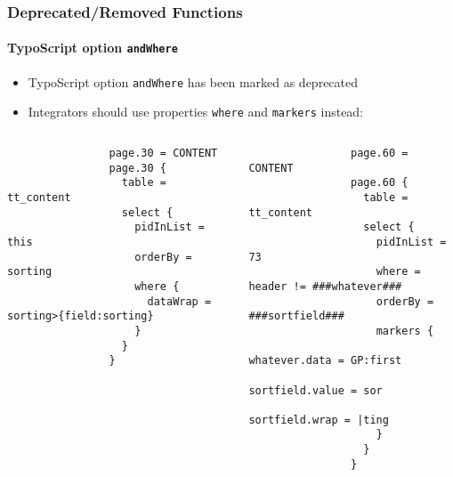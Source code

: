 \begin{frame}[fragile]
	\frametitle{Deprecated/Removed Functions}
	\framesubtitle{TypoScript option \texttt{andWhere}}

	\lstset{basicstyle=\tiny\ttfamily}

	\begin{itemize}
		\item TypoScript option \texttt{andWhere} has been marked as deprecated
		\item Integrators should use properties \texttt{where} and \texttt{markers} instead:
	\end{itemize}

	\begin{columns}[T]
		\begin{column}{.6\textwidth}

			\lstset{xleftmargin=1cm}

			\begin{lstlisting}
				page.30 = CONTENT
				page.30 {
				  table = tt_content
				  select {
				    pidInList = this
				    orderBy = sorting
				    where {
				      dataWrap = sorting>{field:sorting}
				    }
				  }
				}
			\end{lstlisting}
		\end{column}
		\begin{column}{.4\textwidth}
			\begin{lstlisting}
				page.60 = CONTENT
				page.60 {
				  table = tt_content
				  select {
				    pidInList = 73
				    where = header != ###whatever###
				    orderBy = ###sortfield###
				    markers {
				      whatever.data = GP:first
				      sortfield.value = sor
				      sortfield.wrap = |ting
				    }
				  }
				}
			\end{lstlisting}
		\end{column}
	\end{columns}

\end{frame}


